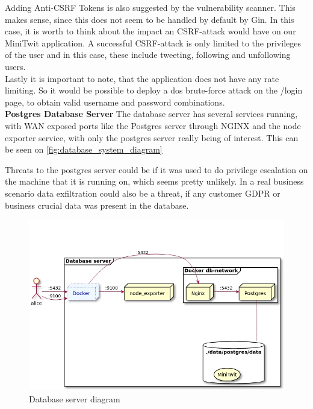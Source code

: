 Adding Anti-CSRF Tokens is also suggested by the vulnerability scanner. This makes sense, since this does not seem to be handled by default by Gin. In this case, it is worth to think about the impact an CSRF-attack would have on our MiniTwit application. A successful CSRF-attack is only limited to the privileges of the user and in this case, these include tweeting, following and unfollowing users.\\


Lastly it is important to note, that the application does not have any rate limiting. So it would be possible to deploy a \gls{dos} brute-force attack on the /login page, to obtain valid username and password combinations.\\

\textbf{Postgres Database Server}
The database server has several services running, with WAN exposed ports like the Postgres server through NGINX and the node exporter service, with only the postgres server really being of interest. This can be seen on \autoref{fig:database_system_diagram}

Threats to the postgres server could be if it was used to do privilege escalation on the machine that it is running on, which seems pretty unlikely. In a real business scenario data exfiltration could also be a threat, if any customer GDPR or business crucial data was present in the database. 

\begin{figure}[H]
    \centering
    \includegraphics[scale=0.4]{images/diagrams/database/database.jpg}
    \caption{Database server diagram}
    \label{fig:database_system_diagram}
\end{figure}

